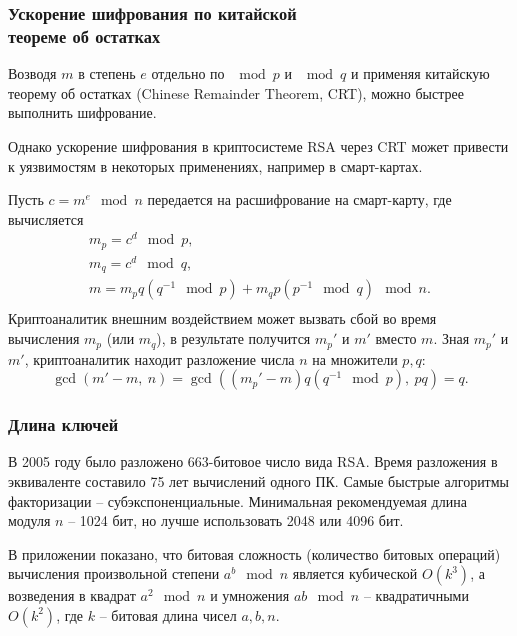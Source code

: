 

\subsubsection[Ускорение шифрования]{Ускорение шифрования по китайской \protect\\ теореме об остатках}

Возводя $m$ в степень $e$ отдельно по $\mod p$ и $\mod q$ и применяя китайскую теорему об остатках (Chinese Remainder Theorem, CRT), можно быстрее выполнить шифрование.

Однако ускорение шифрования в криптосистеме RSA через CRT может привести к уязвимостям в некоторых применениях, например в смарт-картах.

\example
Пусть $c = m^e \mod n$ передается на расшифрование на смарт-карту, где вычисляется
\[ \begin{array}{c}
    m_p = c^d \mod p, \\
    m_q = c^d \mod q, \\
    m = m_p q (q^{-1} \mod p) + m_q p (p^{-1} \mod q) \mod n. \\
\end{array} \]
Криптоаналитик внешним воздействием может вызвать сбой во время вычисления $m_p$ (или $m_q$), в результате получится $m_p'$ и $m'$ вместо $m$. Зная $m_p'$ и $m'$, криптоаналитик находит разложение числа $n$ на множители $p,q$:
    \[ \gcd(m' - m, ~ n) = \gcd( (m_p' - m) q (q^{-1} \mod p), ~ pq) = q. \]
\exampleend


\subsubsection{Длина ключей}

В 2005 году было разложено 663-битовое число вида RSA. Время разложения в эквиваленте составило 75 лет вычислений одного ПК. Самые быстрые алгоритмы факторизации -- субэкспоненциальные. Минимальная рекомендуемая длина модуля $n$ -- 1024 бит, но лучше использовать 2048 или 4096 бит.

В приложении показано, что битовая сложность (количество битовых операций) вычисления произвольной степени $a^b \mod n$ является кубической $O(k^3)$, а возведения в квадрат $a^2 \mod n$ и умножения $a b \mod n$ -- квадратичными $O(k^2)$, где $k$ -- битовая длина чисел $a,b,n$.

